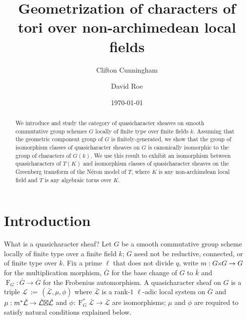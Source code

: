 \documentclass[11pt]{amsart}
\title[Geometrization of characters of tori]{Geometrization of characters of tori over non-archimedean local fields}
\date{\today}
\author{Clifton Cunningham}
\author{David Roe}
\theoremstyle{plain}
\theoremstyle{definition}
\theoremstyle{remark}
\newcommand{\bFq}{\bar{k}}
\newcommand{\Fq}{k}
\newcommand{\Frob}[1]{\operatorname{F}_{#1}}
\newcommand{\ceq}{{\, :=\, }}
\newcommand{\cs}[1]{{\mathcal{#1}}}
\newcommand{\gcs}[1]{{\mathcal{\bar #1}}}
\newcommand{\bG}{\bar{G}}
\newcommand{\tight}[3]{\hspace{-#1pt}{#2}\hspace{-#3pt}}
\newcommand{\GxG}{\text{$G \tight{1}{\times}{1} G$}}
\newcommand{\LxL}{\text{$\gcs{L} \tight{0}{\boxtimes}{0} \gcs{L}$}}
\begin{document}
\begin{abstract}
  We introduce and study the category of quasicharacter sheaves on smooth commutative
  group schemes $G$ locally of finite type over finite fields
  $\Fq$. Assuming that the geometric component group of $G$
  is finitely-generated, we show that the group of isomorphism classes
  of quasicharacter sheaves on $G$ is canonically isomorphic to the group
  of characters of $G(\Fq)$. We use this result to exhibit an
  isomorphism between quasicharacters of $T(K)$ and isomorphism
  classes of quasicharacter sheaves on the Greenberg transform of the Néron
  model of $T$, where $K$ is any non-archimdean local field and $T$ is
  any algebraic torus over $K$.
\end{abstract}

\maketitle

\section*{Introduction}

%
What is a quasicharacter sheaf?
Let $G$ be a smooth commutative group scheme locally of finite
type over a finite field $\Fq$; $G$ need not be reductive, connected, or of
finite type over $\Fq$. Fix a prime $\ell$ that does not divide
$q$, write $m : \GxG \to G$ for the multiplication morphism,
$\bG$ for the base change of $G$ to $\bFq$ and
$\Frob{G} : \bG \to \bG$ for the Frobenius automorphism.
A quasicharacter sheaf on $G$ is a triple $\cs{L}\ceq
(\gcs{L},\mu,\phi)$ where $\gcs{L}$ is a rank-$1$ $\ell$-adic local system on $\bG$ and $\mu: m^*
\gcs{L} \to \LxL$ and $\phi : \Frob{G}^*\gcs{L} \to \gcs{L}$ are isomorphisms;
$\mu$ and $\phi$ are required to satisfy natural conditions explained below.
\end{document}
